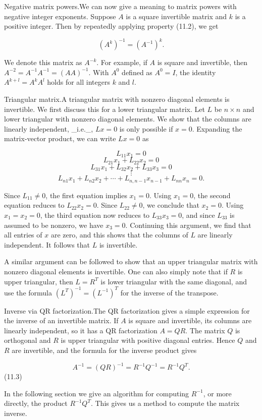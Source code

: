 Negative matrix powers.We can now give a meaning to matrix powers with negative integer exponents. Suppose \(A\) is a square invertible matrix and \(k\) is a positive integer. Then by repeatedly applying property (11.2), we get

\[(A^{k})^{-1}=(A^{-1})^{k}.\]

We denote this matrix as \(A^{-k}\). For example, if \(A\) is square and invertible, then \(A^{-2}=A^{-1}A^{-1}=(AA)^{-1}\). With \(A^{0}\) defined as \(A^{0}=I\), the identity \(A^{k+l}=A^{k}A^{l}\) holds for all integers \(k\) and \(l\).

Triangular matrix.A triangular matrix with nonzero diagonal elements is invertible. We first discuss this for a lower triangular matrix. Let \(L\) be \(n\times n\) and lower triangular with nonzero diagonal elements. We show that the columns are linearly independent, _i.e._, \(Lx=0\) is only possible if \(x=0\). Expanding the matrix-vector product, we can write \(Lx=0\) as

\[L_{11}x_{1} = 0\] \[L_{21}x_{1}+L_{22}x_{2} = 0\] \[L_{31}x_{1}+L_{32}x_{2}+L_{33}x_{3} = 0\] \[\vdots\] \[L_{n1}x_{1}+L_{n2}x_{2}+\cdots+L_{n,n-1}x_{n-1}+L_{nn}x_{n} = 0.\]

Since \(L_{11}\neq 0\), the first equation implies \(x_{1}=0\). Using \(x_{1}=0\), the second equation reduces to \(L_{22}x_{2}=0\). Since \(L_{22}\neq 0\), we conclude that \(x_{2}=0\). Using \(x_{1}=x_{2}=0\), the third equation now reduces to \(L_{33}x_{3}=0\), and since \(L_{33}\) is assumed to be nonzero, we have \(x_{3}=0\). Continuing this argument, we find that all entries of \(x\) are zero, and this shows that the columns of \(L\) are linearly independent. It follows that \(L\) is invertible.

A similar argument can be followed to show that an upper triangular matrix with nonzero diagonal elements is invertible. One can also simply note that if \(R\) is upper triangular, then \(L=R^{T}\) is lower triangular with the same diagonal, and use the formula \((L^{T})^{-1}=(L^{-1})^{T}\) for the inverse of the transpose.

Inverse via QR factorization.The QR factorization gives a simple expression for the inverse of an invertible matrix. If \(A\) is square and invertible, its columns are linearly independent, so it has a QR factorization \(A=QR\). The matrix \(Q\) is orthogonal and \(R\) is upper triangular with positive diagonal entries. Hence \(Q\) and \(R\) are invertible, and the formula for the inverse product gives

\[A^{-1}=(QR)^{-1}=R^{-1}Q^{-1}=R^{-1}Q^{T}.\] (11.3)

In the following section we give an algorithm for computing \(R^{-1}\), or more directly, the product \(R^{-1}Q^{T}\). This gives us a method to compute the matrix inverse.

 
